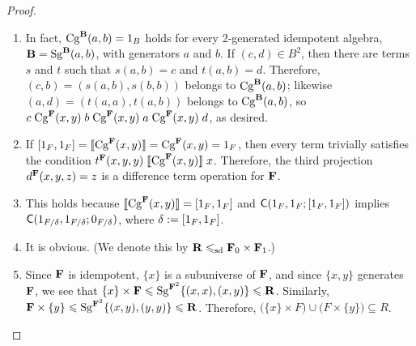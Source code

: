 \pagebreak  

\begin{proof}\
  \begin{enumerate}
  \item  In fact, $\operatorname{Cg}^{\mathbf{B}}(a,b)=1_B$ holds for every
    2-generated idempotent algebra, $\mathbf{B} = \operatorname{Sg}^{\mathbf{B}}(a,b)$, with generators
    $a$ and $b$.  If $(c,d) \in B^2$, then there are terms $s$ and $t$
    such that $s(a,b) = c$ and $t(a,b) = d$.  Therefore, 
    $(c,b) = (s(a,b), s(b,b))$ belongs to $\operatorname{Cg}^{\mathbf{B}}(a,b)$; likewise
    $(a,d) = (t(a,a), t(a,b))$ belongs to $\operatorname{Cg}^{\mathbf{B}}(a,b)$, so
    $c \mathrel{\operatorname{Cg}^{\mathbf{F}}(x,y)} b\mathrel{\operatorname{Cg}^{\mathbf{F}}(x,y)} a \mathrel{\operatorname{Cg}^{\mathbf{F}}(x,y)} d$,
    as desired.
    
    
  \item If $[1_F,1_F] = \llbracket \operatorname{Cg}^{\mathbf{F}}(x,y) \rrbracket = \operatorname{Cg}^{\mathbf{F}}(x,y) = 1_F$, then every term
  trivially satisfies the condition
  $t^{\mathbf{F}}(x,y,y) \mathrel{\llbracket \operatorname{Cg}^{\mathbf{F}}(x,y) \rrbracket} x$.  Therefore, the third projection
  $d^{\mathbf{F}}(x,y,z) = z$ is a difference term operation for $\mathbf{F}$.

\item  This holds because %
  $\llbracket \operatorname{Cg}^{\mathbf{F}}(x,y) \rrbracket = [1_F, 1_F]$ and $\mathsf{C}(1_F, 1_F; [1_F, 1_F])$
  implies $\mathsf{C}(1_{F/\delta}, 1_{F/\delta}; 0_{F/\delta})$, where
  $\delta := [1_F, 1_F]$.

\item It is obvious. 
(We denote this by $\mathbf{R} \leqslant_{\mathrm{sd}} \mathbf{F}_0 \times \mathbf{F}_1$.)


\item
  Since $\mathbf{F}$ is idempotent, $\{x\}$ is a subuniverse of $\mathbf{F}$, and since
  $\{x, y\}$ generates $\mathbf{F}$, we see that
  $\{x\} \times \mathbf{F} \leqslant \operatorname{Sg}^{\mathbf{F}^2}\{(x,x), (x,y)\}\leqslant \mathbf{R}$.
  Similarly, $\mathbf{F}\times \{y\} \leqslant \operatorname{Sg}^{\mathbf{F}^2}\{(x,y), (y,y)\}\leqslant \mathbf{R}$.
  Therefore,
  $\bigl(\{x\} \times F\bigr) \cup \bigl(F \times \{y\}\bigr) \subseteq R$.
  \end{enumerate}

\end{proof}


